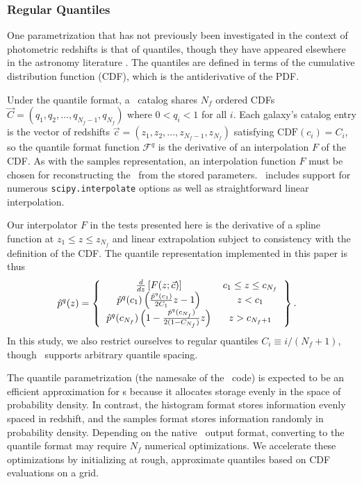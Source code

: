 \subsubsection{Regular Quantiles}

One parametrization that has not previously been investigated in the context of 
photometric redshifts is that of quantiles, though they have appeared elsewhere 
in the astronomy literature \citep{sun_star_2015, pizzocaro_results_2016, 
	laycock_x-ray_2017}.
The quantiles are defined in terms of the cumulative distribution function 
(CDF), which is the antiderivative of the PDF.

Under the quantile format, a \pz\ catalog shares $N_{f}$ ordered CDFs $\vec{C} 
= (q_{1}, q_{2}, \dots, q_{N_{f}-1}, q_{N_{f}})$ where $0 < q_{i} < 1$ for all 
$i$.
Each galaxy's catalog entry is the vector of redshifts $\vec{c} = (z_{1}, 
z_{2}, \dots, z_{N_{f}-1}, z_{N_{f}})$ satisfying $\mathrm{CDF}(c_{i}) = 
C_{i}$, so the quantile format function $\mathcal{F}^{q}$ is the derivative of 
an interpolation $F$ of the CDF.
As with the samples representation, an interpolation function $F$ must be 
chosen for reconstructing the \pz\ from the stored parameters.
\qp\ includes support for numerous \texttt{scipy.interpolate} options as well 
as straightforward linear interpolation.

Our interpolator $F$ in the tests presented here is the derivative of a spline 
function at $z_{1} \leq z \leq z_{N_{f}}$ and linear extrapolation subject to 
consistency with the definition of the CDF.
The quantile representation implemented in this paper is thus
\begin{align}
\eqlabel{eq:quantiles}
\hat{p}^{q}(z) &=
\left\{
\begin{tabular}{cc}
$\frac{d}{dz} \left[F(z; \vec{c}
)\right]$ & $c_{1} \leq z \leq c_{N_{f}}$ \\
$\hat{p}^{q}(c_{1})\left(\frac{\hat{p}^{q}(c_{1})}{2C_{1}} z - 1\right)$ & $z 
< c_{1}$ \\
$\hat{p}^{q}(c_{N_{f}})\left(1 - \frac{\hat{p}^{q}(c_{N_{f}})}{2(1 - 
	C_{N_{f}})} z\right)$ & $z > c_{N_{f}+1}$
\end{tabular}
\right\}.
\end{align}
In this study, we also restrict ourselves to regular quantiles $C_{i} \equiv i 
/ (N_{f} + 1)$, though \qp\ supports arbitrary quantile spacing.


The quantile parametrization (the namesake of the \qp\ code) is expected to be 
an efficient approximation for \pz s because it allocates storage evenly in the 
space of probability density.
In contrast, the histogram format stores information evenly spaced in redshift, 
and the samples format stores information randomly in probability density.
Depending on the native \pz\ output format, converting to the quantile format 
may require $N_{f}$ numerical optimizations.
We accelerate these optimizations by initializing at rough, approximate 
quantiles based on CDF evaluations on a grid.





